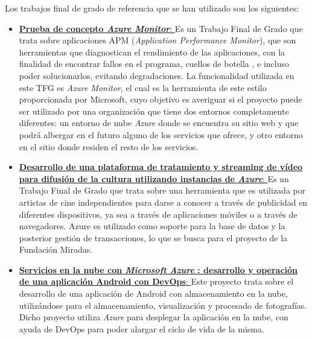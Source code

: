 
Los trabajos final de grado de referencia que se han utilizado son los siguientes:
\begin{itemize}
    \item \href{https://core.ac.uk/download/pdf/286776272.pdf}{\textbf{Prueba de concepto \textit{Azure Monitor}}: } Es un Trabajo Final de Grado que trata sobre aplicaciones APM (\textit{Application Performance Monitor}), 
    que son herramientas que diagnostican el rendimiento de las aplicaciones, con la finalidad de encontrar fallos en el programa, cuellos de botella
    , e incluso poder solucionarlos, evitando degradaciones. La funcionalidad utilizada en este TFG es \textit{Azure Monitor}, el cual es la herramienta de este estilo proporcionada
    por Microsoft, cuyo objetivo es averiguar si el proyecto puede ser utilizado por una organización que tiene dos entornos completamente diferentes: un entorno de nube \textit{Azure} donde 
    se encuentra su sitio web y que podrá albergar en el futuro alguno de los servicios que ofrece,
    y otro entorno en el sitio donde residen el resto de los servicios.
    \item \href{https://repositorio.uam.es/bitstream/handle/10486/688014/Porcar_Querol_Miguel_tfg.pdf?sequence=1}{\textbf{Desarrollo de una plataforma de tratamiento y streaming de vídeo para difusión de la cultura utilizando instancias de \textit{Azure}}: }
    Es un Trabajo Final de Grado que trata sobre una herramienta que es utilizada por artistas de cine independientes para darse a conocer a través de 
    publicidad en diferentes dispositivos, ya sea a través de aplicaciones móviles o a través de navegadores. Azure es utilizado como soporte para la base
    de datos y la posterior gestión de transacciones, lo que se busca para el proyecto de la Fundación Miradas. 
    \item \href{https://oa.upm.es/47777/}{\textbf{Servicios en la nube con \textit{Microsoft Azure} : desarrollo y operación de una aplicación Android con DevOps}: } 
    Este proyecto trata sobre el desarrollo de una aplicación de Android con almacenamiento en la nube, utilizándose para el almacenamiento, visualización y procesado de fotografías.
    Dicho proyecto utiliza \textit{Azure} para desplegar la aplicación en la nube, con ayuda de DevOps para poder alargar el ciclo de vida de la misma.

\end{itemize}
